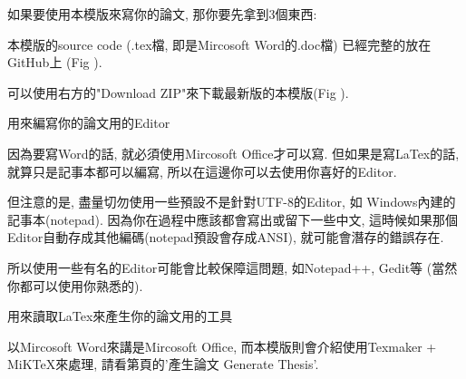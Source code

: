 
如果要使用本模版來寫你的論文, 那你要先拿到3個東西:


本模版的source code (.tex檔, 即是Mircosoft Word的.doc檔) 已經完整的放在GitHub上 (Fig ).


可以使用右方的"Download ZIP"來下載最新版的本模版(Fig ).


用來編寫你的論文用的Editor

因為要寫Word的話, 就必須使用Mircosoft Office才可以寫. 但如果是寫LaTex的話, 就算只是記事本都可以編寫, 所以在這邊你可以去使用你喜好的Editor.

但注意的是, 盡量切勿使用一些預設不是針對UTF-8的Editor, 如 Windows內建的記事本(notepad). 因為你在過程中應該都會寫出或留下一些中文, 這時候如果那個Editor自動存成其他編碼(notepad預設會存成ANSI), 就可能會潛存的錯誤存在.

所以使用一些有名的Editor可能會比較保障這問題, 如Notepad++, Gedit等 (當然你都可以使用你熟悉的).



用來讀取LaTex來產生你的論文用的工具

以Mircosoft Word來講是Mircosoft Office, 而本模版則會介紹使用Texmaker + MiKTeX來處理, 請看第頁的'產生論文 Generate Thesis'.

